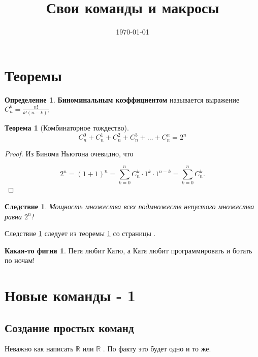 \documentclass[12pt, a4paper]{article}
\title{Свои команды и макросы}
\date{\today}
\theoremstyle{plain}              %
\newtheorem{theorem}{Теорема}[section]
\newtheorem{result}{Следствие}[theorem]
\theoremstyle{definition}         %
\newtheorem*{defin}{Определение}  %
\newtheorem{fignia}{Какая-то фигня}
\begin{document}
\maketitle

\section{Теоремы}

\begin{defin}
\textbf{ Биноминальным коэффициентом} называется выражение $C_n^k = \frac{n!}{k!(n-k)!}$
\end{defin}

\begin{theorem}[Комбинаторное тождество]\label{th:1}
 \[C_n^0 + C_n^1 + C_n^2 + C_n^3 + \ldots + C_n^n = 2^n \]
\end{theorem}
\begin{proof}
Из Бинома Ньютона очевидно, что 

\[ 2^n = (1 + 1)^n = \sum_{k=0}^n C_n^k \cdot 1^k \cdot 1^{n-k} = \sum_{k=0}^n C_n^k. \] 
\end{proof}

\begin{result} \label{sl:1.1} 
Мощность множества всех подмножеств непустого множества равна $2^n$! 
\end{result}

Следствие \ref{sl:1.1} следует из теоремы \ref{th:1} со страницы \pageref{th:1}.


\begin{fignia}
	 Петя любит Катю, а Катя любит программировать и ботать по ночам! 
\end{fignia}


\section{Новые команды - 1}
\subsection{Создание простых команд}

\def \a{\alpha}
\def\R{\ensuremath{\mathbb{R}} } 


\newcommand{\RR}{\ensuremath{\mathbb{R}} }

Неважно как написать \R или \RR. По факту это будет одно и то же.
\end{document}
